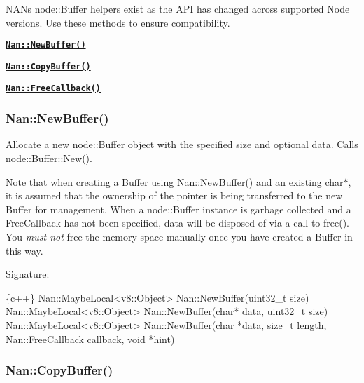 N\+AN\textquotesingle{}s {\ttfamily node\+::\+Buffer} helpers exist as the A\+PI has changed across supported Node versions. Use these methods to ensure compatibility.


\begin{DoxyItemize}
\item \href{#api_nan_new_buffer}{\tt {\bfseries {\ttfamily Nan\+::\+New\+Buffer()}}}
\item \href{#api_nan_copy_buffer}{\tt {\bfseries {\ttfamily Nan\+::\+Copy\+Buffer()}}}
\item \href{#api_nan_free_callback}{\tt {\bfseries {\ttfamily Nan\+::\+Free\+Callback()}}}
\end{DoxyItemize}

\label{_api_nan_new_buffer}%
 \subsubsection*{Nan\+::\+New\+Buffer()}

Allocate a new {\ttfamily node\+::\+Buffer} object with the specified size and optional data. Calls {\ttfamily node\+::\+Buffer\+::\+New()}.

Note that when creating a {\ttfamily Buffer} using {\ttfamily Nan\+::\+New\+Buffer()} and an existing {\ttfamily char$\ast$}, it is assumed that the ownership of the pointer is being transferred to the new {\ttfamily Buffer} for management. When a {\ttfamily node\+::\+Buffer} instance is garbage collected and a {\ttfamily Free\+Callback} has not been specified, {\ttfamily data} will be disposed of via a call to {\ttfamily free()}. You {\itshape must not} free the memory space manually once you have created a {\ttfamily Buffer} in this way.

Signature\+:


\begin{DoxyCode}
\{c++\}
Nan::MaybeLocal<v8::Object> Nan::NewBuffer(uint32\_t size)
Nan::MaybeLocal<v8::Object> Nan::NewBuffer(char* data, uint32\_t size)
Nan::MaybeLocal<v8::Object> Nan::NewBuffer(char *data,
                                           size\_t length,
                                           Nan::FreeCallback callback,
                                           void *hint)
\end{DoxyCode}


\label{_api_nan_copy_buffer}%
 \subsubsection*{Nan\+::\+Copy\+Buffer()}

